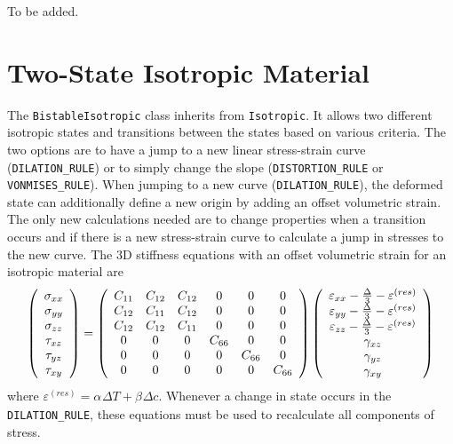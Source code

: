 \documentclass[11pt]{book}
\def\a#1{\alpha_{#1}}
\def\b#1{\beta_{#1}}
\def\code#1{{\small\tt #1}}
\def\DT{\Delta T}
\def\e#1{\varepsilon_{#1}}
\def\er#1{\varepsilon_{#1}^{(res)}}
\def\g#1{\gamma_{#1}}
\def\s#1{\sigma_{#1}}
\def\t#1{\tau_{#1}}
\begin{document}
To be added.

\section{Two-State Isotropic Material}

The \code{BistableIsotropic} class inherits from \code{Isotropic}. It allows two different isotropic states and transitions  between the states based on various criteria. The two options are to have a jump to a new linear stress-strain curve (\code{DILATION\_RULE}) or to simply change the slope (\code{DISTORTION\_RULE} or \code{VONMISES\_RULE}). When jumping to a new curve (\code{DILATION\_RULE}), the deformed state can additionally define a new origin by adding an offset volumetric strain. The only new calculations needed are to change properties when a transition occurs and if there is a new stress-strain curve to calculate a jump in stresses to the new curve. The 3D stiffness equations with an offset volumetric strain for an isotropic material are
\begin{equation}
     \left(\begin{array}{c} \s{xx} \\ \s{yy} \\ \s{zz} \\ \t{xz} \\ \t{yz} \\ \t{xy} \end{array}\right)
       =  \left(\begin{array}{cccccc}
      C_{11} & C_{12} & C_{12} & 0 & 0 & 0 \\
      C_{12} & C_{11} & C_{12} & 0 & 0 & 0 \\
      C_{12} & C_{12} & C_{11} & 0 & 0 & 0 \\
      0 & 0 & 0 & C_{66} & 0 & 0 \\
      0 & 0 & 0 & 0 & C_{66} & 0  \\
      0 & 0 & 0 & 0 & 0 &  C_{66}  \end{array}\right)
     \left(\begin{array}{c} \e{xx} - {\Delta\over 3} -\er{}\\ \e{yy} - {\Delta\over 3} -\er{}\\ 
                   \e{zz} - {\Delta\over 3} - \er{}\\ 
                   \g{xz} \\ \g{yz} \\ \g{xy} \end{array}\right)
\end{equation}
where $\er{}=\a{}\DT+\b{}\Delta c$.
Whenever a change in state occurs in the \code{DILATION\_RULE}, these equations must be used to recalculate all components of stress.
\end{document}
